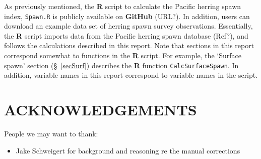 \documentclass[12pt]{article}
\begin{document}
As previously mentioned, the \textbf{R} script to calculate the Pacific herring spawn index, \texttt{Spawn.R} is publicly available on \textbf{GitHub} (URL?).
In addition, users can download an example data set of herring spawn survey observations.
Essentially, the \textbf{R} script imports data from the Pacific herring spawn database (Ref?), and follows the calculations described in this report.
Note that sections in this report correspond somewhat to functions in the \textbf{R} script.
For example, the `Surface spawn' section (\S~\ref{secSurf}) describes the \textbf{R} function \texttt{CalcSurfaceSpawn}.
In addition, variable names in this report correspond to variable names in the script.

\section{ACKNOWLEDGEMENTS}

People we may want to thank:
\begin{itemize}
\item Jake Schweigert for background and reasoning re the manual corrections
\end{itemize}



\end{document}
